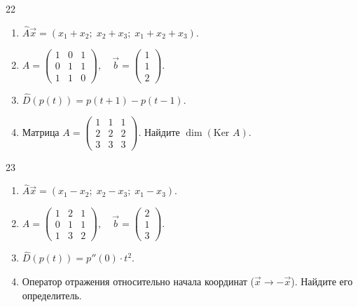 \documentclass[12pt,a4paper]{article}
\theoremstyle{plain}
\theoremstyle{definition}
\begin{document}
\begin{taskbox}{22}
    \begin{enumerate}
        \item $\hat{A}\vec{x} = (x_1 + x_2; \; x_2 + x_3; \; x_1 + x_2 + x_3)$.
        \item $A = \begin{pmatrix} 1 & 0 & 1 \\ 0 & 1 & 1 \\ 1 & 1 & 0 \end{pmatrix}, \quad \vec{b} = \begin{pmatrix} 1 \\ 1 \\ 2 \end{pmatrix}$.
        \item $\hat{D}(p(t)) = p(t+1) - p(t-1)$.
        \item Матрица $A = \begin{pmatrix} 1 & 1 & 1 \\ 2 & 2 & 2 \\ 3 & 3 & 3 \end{pmatrix}$. Найдите $\dim(\text{Ker } A)$.
    \end{enumerate}
\end{taskbox}

\begin{taskbox}{23}
    \begin{enumerate}
        \item $\hat{A}\vec{x} = (x_1 - x_2; \; x_2 - x_3; \; x_1 - x_3)$.
        \item $A = \begin{pmatrix} 1 & 2 & 1 \\ 0 & 1 & 1 \\ 1 & 3 & 2 \end{pmatrix}, \quad \vec{b} = \begin{pmatrix} 2 \\ 1 \\ 3 \end{pmatrix}$.
        \item $\hat{D}(p(t)) = p''(0) \cdot t^2$.
        \item Оператор отражения относительно начала координат ($\vec{x} \to -\vec{x}$). Найдите его определитель.
    \end{enumerate}
\end{taskbox}
\end{document}
